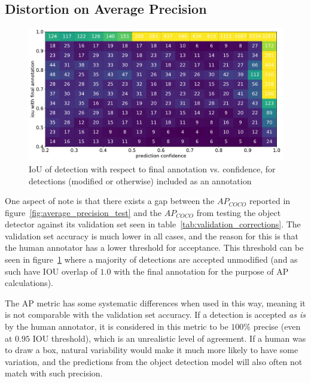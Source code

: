 \subsection{Distortion on Average Precision}
\label{sec:distortion_precision}

\begin{figure}[ht]
\centering
\includegraphics[width=1.0\linewidth]{charts/scatters/confidence_iou.pdf}
\caption{ IoU of detection with respect to final annotation vs. confidence, for detections (modified or otherwise) included as an annotation }
\label{fig:iou_confidence}
\end{figure}

One aspect of note is that there exists a gap between the $AP_{COCO}$ reported in figure~\ref{fig:average_precision_test} and the $AP_{COCO}$ from testing the object detector against its validation set seen in table~\ref{tab:validation_corrections}. The validation set accuracy is much lower in all cases, and the reason for this is that the human annotator has a lower threshold for acceptance. This threshold can be seen in figure~\ref{fig:iou_confidence} where a majority of detections are accepted unmodified (and as such have \gls{IOU} overlap of $1.0$ with the final annotation for the purpose of \gls{AP} calculations).

The \gls{AP} metric has some systematic differences when used in this way, meaning it is not comparable with the validation set accuracy. If a detection is accepted \emph{as is} by the human annotator, it is considered in this metric to be $100\%$ precise (even at $0.95$ \gls{IOU} threshold), which is an unrealistic level of agreement. If a human was to draw a box, natural variability would make it much more likely to have some variation, and the predictions from the object detection model will also often not match with such precision.

